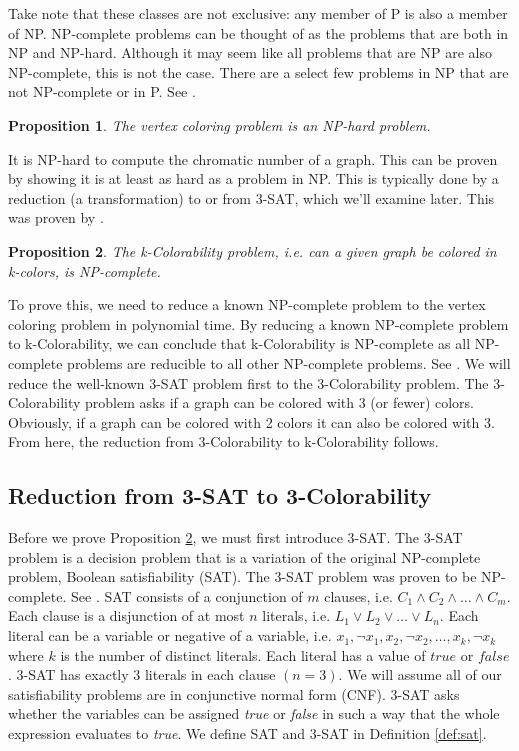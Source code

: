 \documentclass{article}
\newtheorem{prop}{Proposition}
\theoremstyle{definition}
\begin{document}
Take note that these classes are not exclusive: any member of P is also a member of NP. NP-complete problems can be thought of as the problems that are both in NP and NP-hard. Although it may seem like all problems that are NP are also NP-complete, this is not the case. There are a select few problems in NP that are not NP-complete or in P. See \citet{ladner1975structure}.

\begin{prop}
The vertex coloring problem is an NP-hard problem.
\end{prop}

It is NP-hard to compute the chromatic number of a graph. This can be proven by showing it is at least as hard as a problem in NP. This is typically done by a reduction (a transformation) to or from 3-SAT, which we'll examine later. This was proven by \citet{garey}.

\begin{prop}\label{prop:k-color-np-complete}
The k-Colorability problem, i.e. can a given graph be colored in k-colors, is NP-complete.
\end{prop}

To prove this, we need to reduce a known NP-complete problem to the vertex coloring problem in polynomial time. By reducing a known NP-complete problem to k-Colorability, we can conclude that k-Colorability is NP-complete as all NP-complete problems are reducible to all other NP-complete problems. See \citet{gareynp}. We will reduce the well-known 3-SAT problem first to the 3-Colorability problem. The 3-Colorability problem asks if a graph can be colored with 3 (or fewer) colors. Obviously, if a graph can be colored with 2 colors it can also be colored with 3.  From here, the reduction from 3-Colorability to k-Colorability follows.

\subsection{Reduction from 3-SAT to 3-Colorability}
Before we prove Proposition \ref{prop:k-color-np-complete}, we must first introduce 3-SAT.  The 3-SAT problem is a decision problem that is a variation of the original NP-complete problem, Boolean satisfiability (SAT). The 3-SAT problem was proven to be NP-complete. See \citet{gareynp}. SAT consists of a conjunction of $m$ clauses, i.e. $C_1 \wedge C_2 \wedge \dots \wedge C_m$. Each clause is a disjunction of at most $n$ literals, i.e. $L_1 \vee L_2 \vee \dots \vee L_n$. Each literal can be a variable or negative of a variable, i.e. $x_1, \neg x_1, x_2, \neg x_2, \dots , x_k, \neg x_k$ where $k$ is the number of distinct literals. Each literal has a value of $true$ or $false$. 3-SAT has exactly 3 literals in each clause $(n = 3)$. We will assume all of our satisfiability problems are in conjunctive normal form (CNF). 3-SAT asks whether the variables can be assigned \emph{true} or \emph{false} in such a way that the whole expression evaluates to \emph{true}. We define SAT and 3-SAT in Definition \ref{def:sat}.
\end{document}
